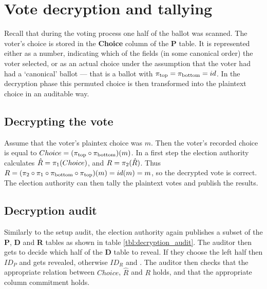 \chapter{Vote decryption and tallying}
\label{ch:tally}

Recall that during the voting process one half of the ballot was scanned. The
voter's choice is stored in the \textbf{Choice} column of the \textbf{P} table. It
is represented either as a number, indicating which of the fields (in some
canonical order) the voter selected, or as an actual choice under the
assumption that the voter had had a `canonical' ballot --- that is a ballot
with $\pi_{\text{top}} = \pi_{\text{bottom}} = id$. In the decryption phase this permuted choice is
then transformed into the plaintext choice in an auditable way.

\section{Decrypting the vote}

Assume that the voter's plaintex choice was $m$. Then the voter's recorded
choice is equal to $Choice = (\pi_{\text{top}}{} \circ \pi_{\text{bottom}}{})(m)$. In a first step
the election authority calculates $\hat{R} = \pi_1{}(Choice)$, and $R =
\pi_2{}(\hat{R})$. Thus $R = (\pi_2 \circ \pi_1 \circ \pi_{\text{bottom}} \circ \pi_{\text{top}})(m)
= id(m) = m$, so the decrypted vote is correct. The election authority can then
tally the plaintext votes and publish the results.

\section{Decryption audit}

Similarly to the setup audit, the election authority again publishes a subset
of the \textbf{P}, \textbf{D} and \textbf{R} tables as shown in table
\ref{tbl:decryption_audit}. The auditor then gets to decide which half of the
\textbf{D} table to reveal. If they choose the left half then $ID_P$ and \pone{}
gets revealed, otherwise $ID_R$ and \ptwo{}. The auditor then checks that the
appropriate relation between $Choice$, $\hat{R}$ and $R$ holds, and that the
appropriate column commitment holds.

